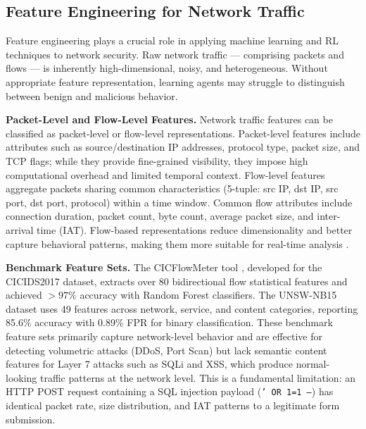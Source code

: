 \documentclass[12pt,a4paper]{report}
\begin{document}
\subsection{Feature Engineering for Network Traffic}

Feature engineering plays a crucial role in applying machine learning and RL techniques to network security. Raw network traffic --- comprising packets and flows --- is inherently high-dimensional, noisy, and heterogeneous. Without appropriate feature representation, learning agents may struggle to distinguish between benign and malicious behavior.

\textbf{Packet-Level and Flow-Level Features.} Network traffic features can be classified as packet-level or flow-level representations. Packet-level features include attributes such as source/destination IP addresses, protocol type, packet size, and TCP flags; while they provide fine-grained visibility, they impose high computational overhead and limited temporal context. Flow-level features aggregate packets sharing common characteristics (5-tuple: src IP, dst IP, src port, dst port, protocol) within a time window. Common flow attributes include connection duration, packet count, byte count, average packet size, and inter-arrival time (IAT). Flow-based representations reduce dimensionality and better capture behavioral patterns, making them more suitable for real-time analysis \cite{flowFeatureSurvey2020}.

\textbf{Benchmark Feature Sets.} The CICFlowMeter tool \cite{sharafaldin2018cicids}, developed for the CICIDS2017 dataset, extracts over 80 bidirectional flow statistical features and achieved ${>}97\%$ accuracy with Random Forest classifiers. The UNSW-NB15 dataset \cite{moustafa2015unswnb15} uses 49 features across network, service, and content categories, reporting 85.6\% accuracy with 0.89\% FPR for binary classification. These benchmark feature sets primarily capture network-level behavior and are effective for detecting volumetric attacks (DDoS, Port Scan) but lack semantic content features for Layer 7 attacks such as SQLi and XSS, which produce normal-looking traffic patterns at the network level. This is a fundamental limitation: an HTTP POST request containing a SQL injection payload (\texttt{' OR 1=1 --}) has identical packet rate, size distribution, and IAT patterns to a legitimate form submission.
\end{document}

